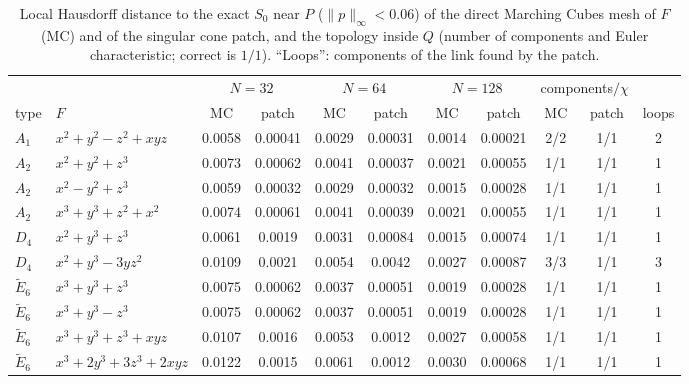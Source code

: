 \documentclass[12pt, a4paper, oneside]{book}
\theoremstyle{plain}
\theoremstyle{definition}
\theoremstyle{remark}
\theoremstyle{definition}
\begin{document}
\begin{table}[!ht]
\centering
\small
\begin{adjustbox}{max width=\textwidth}
\begin{tabular}{l l c c c c c c c c c}
\toprule
& & \multicolumn{2}{c}{$N=32$} & \multicolumn{2}{c}{$N=64$} & \multicolumn{2}{c}{$N=128$} & \multicolumn{2}{c}{components$/\chi$} & \\
\cmidrule(lr){3-4}\cmidrule(lr){5-6}\cmidrule(lr){7-8}\cmidrule(lr){9-10}
type & $F$ & MC & patch & MC & patch & MC & patch & MC & patch & loops \\
\midrule
$A_1$ & $x^2+y^2-z^2+xyz$ & 0.0058 & 0.00041 & 0.0029 & 0.00031 & 0.0014 & 0.00021 & 2/2 & 1/1 & 2 \\
$A_2$ & $x^2+y^2+z^3$ & 0.0073 & 0.00062 & 0.0041 & 0.00037 & 0.0021 & 0.00055 & 1/1 & 1/1 & 1 \\
$A_2$ & $x^2-y^2+z^3$ & 0.0059 & 0.00032 & 0.0029 & 0.00032 & 0.0015 & 0.00028 & 1/1 & 1/1 & 1 \\
$A_2$ & $x^3+y^3+z^2+x^2$ & 0.0074 & 0.00061 & 0.0041 & 0.00039 & 0.0021 & 0.00055 & 1/1 & 1/1 & 1 \\
$D_4$ & $x^2+y^3+z^3$ & 0.0061 & 0.0019 & 0.0031 & 0.00084 & 0.0015 & 0.00074 & 1/1 & 1/1 & 1 \\
$D_4$ & $x^2+y^3-3yz^2$ & 0.0109 & 0.0021 & 0.0054 & 0.0042 & 0.0027 & 0.00087 & 3/3 & 1/1 & 3 \\
$\tilde E_6$ & $x^3+y^3+z^3$ & 0.0075 & 0.00062 & 0.0037 & 0.00051 & 0.0019 & 0.00028 & 1/1 & 1/1 & 1 \\
$\tilde E_6$ & $x^3+y^3-z^3$ & 0.0075 & 0.00062 & 0.0037 & 0.00051 & 0.0019 & 0.00028 & 1/1 & 1/1 & 1 \\
$\tilde E_6$ & $x^3+y^3+z^3+xyz$ & 0.0107 & 0.0016 & 0.0053 & 0.0012 & 0.0027 & 0.00058 & 1/1 & 1/1 & 1 \\
$\tilde E_6$ & $x^3+2y^3+3z^3+2xyz$ & 0.0122 & 0.0015 & 0.0061 & 0.0012 & 0.0030 & 0.00068 & 1/1 & 1/1 & 1 \\
\bottomrule
\end{tabular}
\end{adjustbox}
\caption[Cone patch against Marching Cubes]{Local Hausdorff distance to the exact
$S_0$ near $P$ ($\|p\|_\infty<0.06$) of the direct Marching Cubes mesh of $F$ (MC)
and of the singular cone patch, and the topology inside $Q$ (number of components and
Euler characteristic; correct is $1/1$). ``Loops'': components of the link found by
the patch.}
\label{tab:cone-vs-mc}
\end{table}
\end{document}
